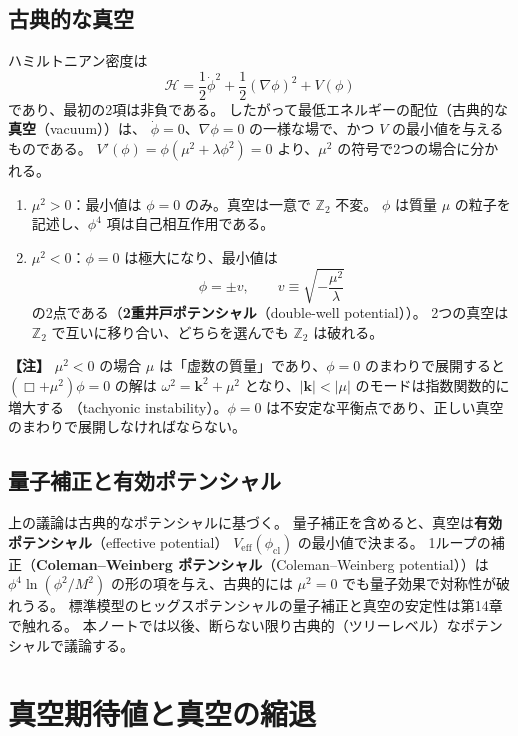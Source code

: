 \documentclass[uplatex,dvipdfmx,a4paper,11pt,openany]{jsbook}
\newcommand{\term}[2]{\textbf{#1}（#2）}
\newcommand{\en}[1]{（#1）}
\newenvironment{note}{\vspace{1ex}\par\footnotesize\noindent\textbf{【注】}}{\par\vspace{1ex}}
\numberwithin{equation}{chapter}
\theoremstyle{definition}
\theoremstyle{plain}
\theoremstyle{remark}
\begin{document}
\subsection{古典的な真空}
ハミルトニアン密度は
\begin{equation}
\mathcal H=\frac12\dot\phi^2+\frac12(\nabla\phi)^2+V(\phi)
\end{equation}
であり、最初の2項は非負である。
したがって最低エネルギーの配位（古典的な\term{真空}{vacuum}）は、
$\dot\phi=0$、$\nabla\phi=0$ の一様な場で、かつ $V$ の最小値を与えるものである。
$V'(\phi)=\phi(\mu^2+\lambda\phi^2)=0$ より、$\mu^2$ の符号で2つの場合に分かれる。
\begin{enumerate}
    \item $\mu^2>0$：最小値は $\phi=0$ のみ。真空は一意で $\mathbb Z_2$ 不変。
    $\phi$ は質量 $\mu$ の粒子を記述し、$\phi^4$ 項は自己相互作用である。
    \item $\mu^2<0$：$\phi=0$ は極大になり、最小値は
    \begin{equation}
    \phi=\pm v,\qquad v\equiv\sqrt{-\frac{\mu^2}{\lambda}}
    \label{eq:Z2-vev}
    \end{equation}
    の2点である（\term{2重井戸ポテンシャル}{double-well potential}）。
    2つの真空は $\mathbb Z_2$ で互いに移り合い、どちらを選んでも $\mathbb Z_2$ は破れる。
\end{enumerate}
\begin{note}
$\mu^2<0$ の場合 $\mu$ は「虚数の質量」であり、$\phi=0$ のまわりで展開すると
$(\Box+\mu^2)\phi=0$ の解は $\omega^2=\bm k^2+\mu^2$ となり、$|\bm k|<|\mu|$ のモードは指数関数的に増大する
\en{tachyonic instability}。$\phi=0$ は不安定な平衡点であり、正しい真空のまわりで展開しなければならない。
\end{note}
\subsection{量子補正と有効ポテンシャル}
上の議論は古典的なポテンシャルに基づく。
量子補正を含めると、真空は\term{有効ポテンシャル}{effective potential} $V_{\mathrm{eff}}(\phi_{\mathrm{cl}})$ の最小値で決まる。
1ループの補正（\term{Coleman--Weinberg ポテンシャル}{Coleman--Weinberg potential}）は
$\phi^4\ln(\phi^2/M^2)$ の形の項を与え、古典的には $\mu^2=0$ でも量子効果で対称性が破れうる。
標準模型のヒッグスポテンシャルの量子補正と真空の安定性は第14章で触れる。
本ノートでは以後、断らない限り古典的（ツリーレベル）なポテンシャルで議論する。
\section{真空期待値と真空の縮退}
\label{sec:vev}
\end{document}
